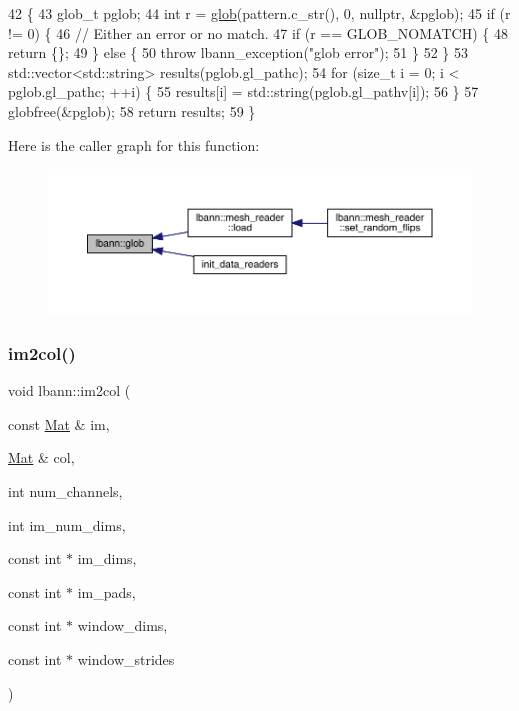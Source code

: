 \begin{DoxyCode}
42                                                            \{
43   glob\_t pglob;
44   \textcolor{keywordtype}{int} r = \hyperlink{namespacelbann_a840c9f1d5f27bc30d081fb90529889e6}{glob}(pattern.c\_str(), 0, \textcolor{keyword}{nullptr}, &pglob);
45   \textcolor{keywordflow}{if} (r != 0) \{
46     \textcolor{comment}{// Either an error or no match.}
47     \textcolor{keywordflow}{if} (r == GLOB\_NOMATCH) \{
48       \textcolor{keywordflow}{return} \{\};
49     \} \textcolor{keywordflow}{else} \{
50       \textcolor{keywordflow}{throw} lbann\_exception(\textcolor{stringliteral}{"glob error"});
51     \}
52   \}
53   std::vector<std::string> results(pglob.gl\_pathc);
54   \textcolor{keywordflow}{for} (\textcolor{keywordtype}{size\_t} i = 0; i < pglob.gl\_pathc; ++i) \{
55     results[i] = std::string(pglob.gl\_pathv[i]);
56   \}
57   globfree(&pglob);
58   \textcolor{keywordflow}{return} results;
59 \}
\end{DoxyCode}
Here is the caller graph for this function\+:\nopagebreak
\begin{figure}[H]
\begin{center}
\leavevmode
\includegraphics[width=350pt]{namespacelbann_a840c9f1d5f27bc30d081fb90529889e6_icgraph}
\end{center}
\end{figure}
\mbox{\label{namespacelbann_aa3636a1979e40da2af91f30a12b90db9}} 
\subsubsection{\texorpdfstring{im2col()}{im2col()}}
{\footnotesize\ttfamily void lbann\+::im2col (\begin{DoxyParamCaption}\item[{const \hyperlink{base_8hpp_a68f11fdc31b62516cb310831bbe54d73}{Mat} \&}]{im,  }\item[{\hyperlink{base_8hpp_a68f11fdc31b62516cb310831bbe54d73}{Mat} \&}]{col,  }\item[{int}]{num\+\_\+channels,  }\item[{int}]{im\+\_\+num\+\_\+dims,  }\item[{const int $\ast$}]{im\+\_\+dims,  }\item[{const int $\ast$}]{im\+\_\+pads,  }\item[{const int $\ast$}]{window\+\_\+dims,  }\item[{const int $\ast$}]{window\+\_\+strides }\end{DoxyParamCaption})}



